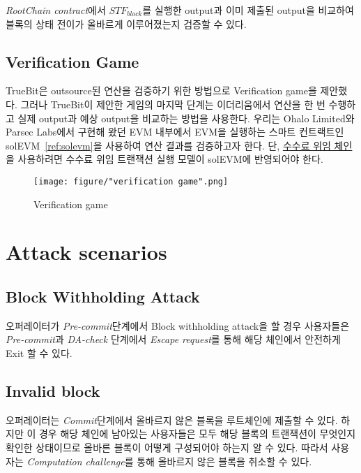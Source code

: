 \documentclass[letterpaper, 11pt]{article}
\begin{document}
\begin{CJK}{UTF8}{mj}
\begin{CJK}{UTF8}{mj}
\emph{RootChain contract}에서 $STF_{block}$를 실행한 output과 이미 제출된 output을 비교하여 블록의 상태 전이가 올바르게 이루어졌는지 검증할 수 있다.
\end{CJK}

\subsection{Verification Game}
\begin{CJK}{UTF8}{mj}
TrueBit은 outsource된 연산을 검증하기 위한 방법으로 Verification game을 제안했다. 그러나 TrueBit이 제안한 게임의 마지막 단계는 이더리움에서 연산을 한 번 수행하고 실제 output과 예상 output을 비교하는 방법을 사용한다. 우리는 Ohalo Limited와 Parsec Labs에서 구현해 왔던 EVM 내부에서 EVM을 실행하는 스마트 컨트랙트인 solEVM~\ref{ref:solevm}을 사용하여 연산 결과를 검증하고자 한다. 단, \href{https://hackmd.io/s/SkxNKAXU7}{수수료 위임 체인}을 사용하려면 수수료 위임 트랜잭션 실행 모델이 solEVM에 반영되어야 한다.
\end{CJK}


\begin{figure}[!h]
\centering
\texttt{[image: figure/"verification game".png]}
\caption{Verification game}
\label{fig:figure5}
\end{figure}
\end{CJK}

\section{Attack scenarios}
\begin{CJK}{UTF8}{mj}

\end{CJK}

\subsection{Block Withholding Attack}
\begin{CJK}{UTF8}{mj}
오퍼레이터가 \emph{Pre-commit}단계에서 Block withholding attack을 할 경우 사용자들은 \emph{Pre-commit}과 \emph{DA-check} 단계에서 \emph{Escape request}를 통해 해당 체인에서 안전하게 Exit 할 수 있다.
\end{CJK}

\subsection{Invalid block}
\begin{CJK}{UTF8}{mj}
오퍼레이터는 \emph{Commit}단계에서 올바르지 않은 블록을 루트체인에 제출할 수 있다. 하지만 이 경우 해당 체인에 남아있는 사용자들은 모두 해당 블록의 트랜잭션이 무엇인지 확인한 상태이므로 올바른 블록이 어떻게 구성되어야 하는지 알 수 있다. 따라서 사용자는 \emph{Computation challenge}를 통해 올바르지 않은 블록을 취소할 수 있다.
\end{CJK}
\end{document}
